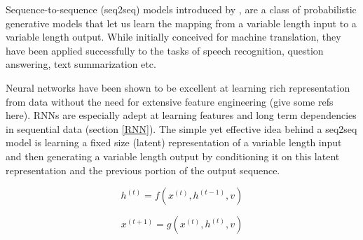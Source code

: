 Sequence-to-sequence (seq2seq) models introduced by \cite{Sutskever2014}, \cite{GRU} are a class of probabilistic generative models that let us learn the mapping from a variable length input to a variable length output. While initially conceived for machine translation, they have been applied successfully to the tasks of speech recognition, question answering, text summarization etc.

Neural networks have been shown to be excellent at learning rich representation from data without the need for extensive feature engineering (give some refs here). RNNs are especially adept at learning features and long term dependencies in sequential data (section \ref{RNN}). The simple yet effective idea behind a seq2seq model is learning a fixed size (latent) representation of a variable length input and then generating a variable length output by conditioning it on this latent representation and the previous portion of the output sequence.

\begin{equation}
	h^{(t)} = f(x^{(t)}, h^{(t-1)}, v)
\end{equation}

\begin{equation}
	x^{(t+1)} = g(x^{(t)}, h^{(t)}, v)
\end{equation}